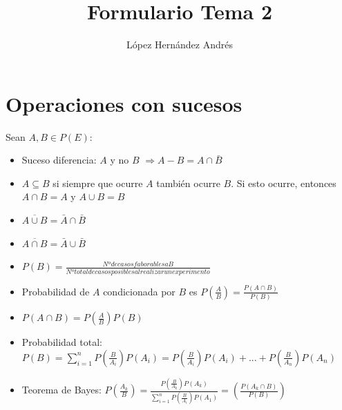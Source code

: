 \documentclass{pye-resumen}
\title{Formulario Tema 2}
\author{López Hernández Andrés}
\begin{document}
	\maketitle
	\section{Operaciones con sucesos}
	Sean $A,B \in P(E):$
	\begin{itemize}
		\item Suceso diferencia: $A$ y no $B$ $\Rightarrow A-B = A\cap\bar{B}$
		\item $A\subseteq B$ si siempre que ocurre $A$ también ocurre $B$. Si esto ocurre, entonces $A\cap B = A$ y $A \cup B = B$
		\item $\overline{A\cup B} = \bar{A} \cap \bar{B} $
		\item $\overline{A\cap B} = \bar{A} \cup \bar{B}$
		\item $P(B) = \frac{Nº de casos faborables a B}{Nº total de casos posibles al realizar un experimento}$
		\item Probabilidad de $A$ condicionada por $B$ es $P\left( \frac{A}{B} \right) = \frac{P\left(A \cap B \right)}{P(B)} $
		\item $P(A\cap B) = P\left(\frac{A}{B} \right)P(B)$
		\item Probabilidad total: $P(B) = \sum_{i=1}^{n} P\left(\frac{B}{A_i} \right)P\left( A_i \right) = P\left( \frac{B}{A_i} \right)P\left(A_i\right) + ... + P\left(\frac{B}{A_n}\right)P\left(A_n\right)$
		\item Teorema de Bayes: $P\left(\frac{A_k}{B}\right) = \frac{ P\left(\frac{B}{A_k}\right)P\left(A_k\right) } { \sum_{i=1}^{n} P\left(\frac{B}{A_i}\right) P\left(A_1\right) } = \left(\frac{P\left(A_k \cap B\right)}{P(B)}\right) $
	\end{itemize}
	
	
\end{document}
